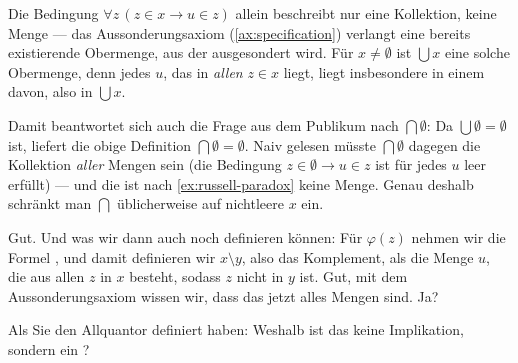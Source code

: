 \begin{math-stroke}

\begin{explanation-of-steps}
Die Bedingung $\forall z \, (z \in x \rightarrow u \in z)$ allein beschreibt nur eine Kollektion, keine Menge --- das Aussonderungsaxiom (\cref{ax:specification}) verlangt eine bereits existierende Obermenge, aus der ausgesondert wird. Für $x \neq \emptyset$ ist $\bigcup x$ eine solche Obermenge, denn jedes $u$, das in \emph{allen} $z \in x$ liegt, liegt insbesondere in einem davon, also in $\bigcup x$.

Damit beantwortet sich auch die Frage aus dem Publikum nach $\bigcap \emptyset$: Da $\bigcup \emptyset = \emptyset$ ist, liefert die obige Definition $\bigcap \emptyset = \emptyset$. Naiv gelesen müsste $\bigcap \emptyset$ dagegen die Kollektion \emph{aller} Mengen sein (die Bedingung $z \in \emptyset \rightarrow u \in z$ ist für jedes $u$ leer erfüllt) --- und die ist nach \cref{ex:russell-paradox} keine Menge. Genau deshalb schränkt man $\bigcap$ üblicherweise auf nichtleere $x$ ein.
\end{explanation-of-steps}
\end{math-stroke}

\begin{spoken-clean}[00:36:56 - 00:38:38]
Gut. Und was wir dann auch noch definieren können: Für $\varphi(z)$ nehmen wir die Formel , und damit definieren wir $x \setminus y$, also das Komplement, als die Menge $u$, die aus allen $z$ in $x$ besteht, sodass $z$ nicht in $y$ ist. Gut, mit dem Aussonderungsaxiom wissen wir, dass das jetzt alles Mengen sind. Ja?
\end{spoken-clean}

\begin{student-interaction}[Studentenfrage]
Als Sie den Allquantor definiert haben: Weshalb ist das keine Implikation, sondern ein ?
\end{student-interaction}

